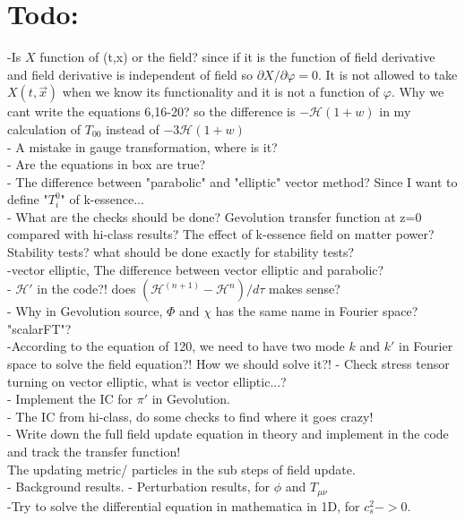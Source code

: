\documentclass[a4paper,11pt]{article}
\begin{document}
\section{Todo:}
-Is $X$ function of (t,x) or the field? since if it is the function of field derivative and field derivative is independent of field so $\partial X/\partial \varphi=0$. It is not allowed to take $X (t,\vec{x})$ when we know its functionality and it is not a function of $\varphi$. Why we cant write the equations 6,16-20? so the difference is   $- \mathcal{H} (1+w) $ in my calculation of $T_{00}$ instead of $-3 \mathcal{H}(1+w)$\\
  - A mistake in gauge transformation, where is it? \\
  - Are the equations in box are true?\\
  - The difference between "parabolic" and "elliptic" vector method? Since  I want to define "$T_i^0$" of k-essence... \\
  - What are the checks should be done? Gevolution transfer function at z=0 compared with hi-class results? The effect of k-essence field on matter power? Stability tests? what should be done exactly for stability tests? \\
   -vector elliptic, The difference between vector elliptic and parabolic?\\
  - $\mathcal{H}'$  in the code?! does $(\mathcal{H}^{(n+1)}-\mathcal{H}^{n})/d\tau$ makes sense? \\
 - Why in Gevolution source, $\Phi$ and $\chi$ has the same name in Fourier space? "scalarFT"? \\
 -According to the equation of 120, we need to have two mode $k$ and $k'$ in Fourier space to solve the field equation?! How we should solve it?!
  - Check stress tensor turning on vector elliptic, what is vector elliptic...? \\
  - Implement the IC for $\pi'$ in Gevolution. \\
  - The IC from hi-class, do some checks to find where it goes crazy! \\
  - Write down the full field update equation in theory and implement in the code and track the transfer function!\\
The updating metric/ particles in the sub steps of field update. \\
- Background results.
- Perturbation results, for $\phi$ and $T_{\mu \nu}$  \\
-Try to solve the differential equation in mathematica in 1D, for $c_s^2 ->0$. \\
\end{document}
